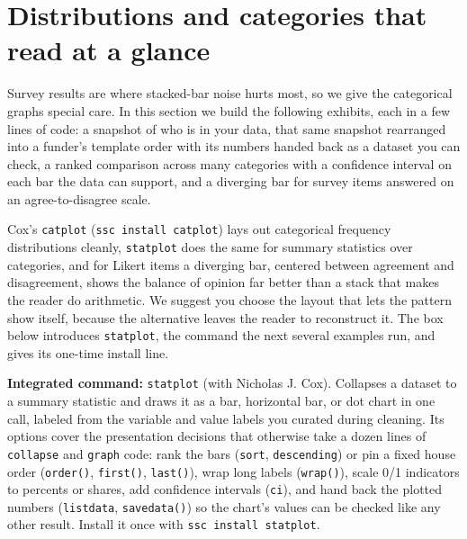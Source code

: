 \section{Distributions and categories that read at a glance}
Survey results are where stacked-bar noise hurts most, so we give the categorical graphs special care. In this section we build the following exhibits, each in a few lines of code: a snapshot of who is in your data, that same snapshot rearranged into a funder's template order with its numbers handed back as a dataset you can check, a ranked comparison across many categories with a confidence interval on each bar the data can support, and a diverging bar for survey items answered on an agree-to-disagree scale.

Cox's \texttt{catplot} (\texttt{ssc install catplot}) lays out categorical frequency distributions cleanly, \texttt{statplot} does the same for summary statistics over categories, and for Likert items a diverging bar, centered between agreement and disagreement, shows the balance of opinion far better than a stack that makes the reader do arithmetic. We suggest you choose the layout that lets the pattern show itself, because the alternative leaves the reader to reconstruct it. The box below introduces \texttt{statplot}, the command the next several examples run, and gives its one-time install line.

\begin{kaobox}[frametitle=Package Integration: \texttt{statplot}]
\textbf{Integrated command:} \texttt{statplot} (with Nicholas J. Cox). Collapses a dataset to a summary statistic and draws it as a bar, horizontal bar, or dot chart in one call, labeled from the variable and value labels you curated during cleaning. Its options cover the presentation decisions that otherwise take a dozen lines of \texttt{collapse} and \texttt{graph} code: rank the bars (\texttt{sort}, \texttt{descending}) or pin a fixed house order (\texttt{order()}, \texttt{first()}, \texttt{last()}), wrap long labels (\texttt{wrap()}), scale 0/1 indicators to percents or shares, add confidence intervals (\texttt{ci}), and hand back the plotted numbers (\texttt{listdata}, \texttt{savedata()}) so the chart's values can be checked like any other result. Install it once with \texttt{ssc install statplot}.
\end{kaobox}

